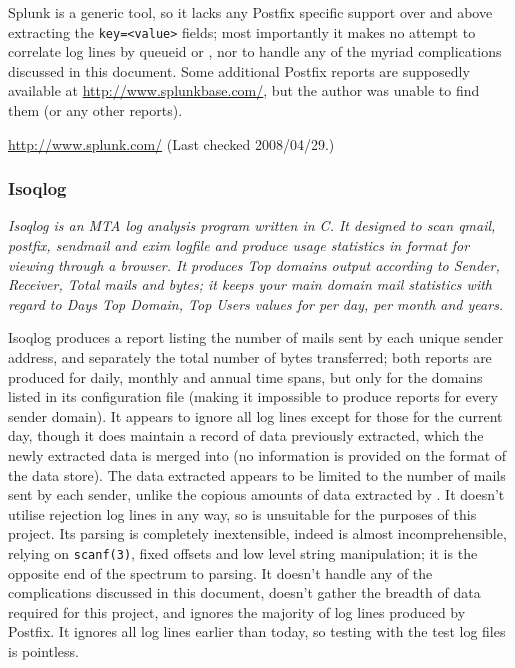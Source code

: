 Splunk is a generic tool, so it lacks any Postfix specific support over and
above extracting the \texttt{key=<value>} fields; most importantly it makes
no attempt to correlate log lines by queueid or \pid{}, nor to handle any
of the myriad complications discussed in this document.  Some additional
Postfix reports are supposedly available at
\url{http://www.splunkbase.com/}, but the author was unable to find them
(or any other reports).

\url{http://www.splunk.com/} \newline (Last checked 2008/04/29.)

\subsubsection{Isoqlog}

\textit{Isoqlog is an MTA log analysis program written in C. It designed to
scan qmail, postfix, sendmail and exim logfile and produce usage statistics
in \HTML{} format for viewing through a browser. It produces Top domains
output according to Sender, Receiver, Total mails and bytes; it keeps your
main domain mail statistics with regard to Days Top Domain, Top Users
values for per day, per month and years.\/}

Isoqlog produces a report listing the number of mails sent by each unique
sender address, and separately the total number of bytes transferred; both
reports are produced for daily, monthly and annual time spans, but only for
the domains listed in its configuration file (making it impossible to
produce reports for every sender domain).  It appears to ignore all log
lines except for those for the current day, though it does maintain a
record of data previously extracted, which the newly extracted data is
merged into (no information is provided on the format of the data store).
The data extracted appears to be limited to the number of mails sent by
each sender, unlike the copious amounts of data extracted by \parsername{}.
It doesn't utilise rejection log lines in any way, so is unsuitable for the
purposes of this project.  Its parsing is completely inextensible, indeed
is almost incomprehensible, relying on \texttt{scanf(3)}, fixed offsets and
low level string manipulation; it is the opposite end of the spectrum to
\parsernames{} parsing.  It doesn't handle any of the complications
discussed in this document, doesn't gather the breadth of data required for
this project, and ignores the majority of log lines produced by Postfix.
It ignores all log lines earlier than today, so testing with the test log
files is pointless.

